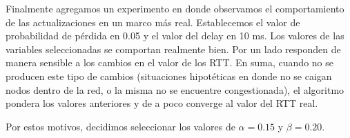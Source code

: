 Finalmente agregamos un experimento en donde observamos el comportamiento de las actualizaciones en
un marco más real. Establecemos el valor de probabilidad de pérdida en 0.05 y el valor del delay en
10 ms.
Los valores de las variables seleccionadas se comportan realmente bien. Por un lado responden de manera
sensible a los cambios en el valor de los RTT. En suma, cuando no se
producen este tipo de cambios (situaciones hipotéticas en donde no se caigan nodos dentro de la red, o
la misma no se encuentre congestionada), el algoritmo pondera los valores anteriores y de a poco
converge al valor del RTT real.

Por estos motivos, decidimos seleccionar los valores de $\alpha=0.15$ y $\beta=0.20$.







